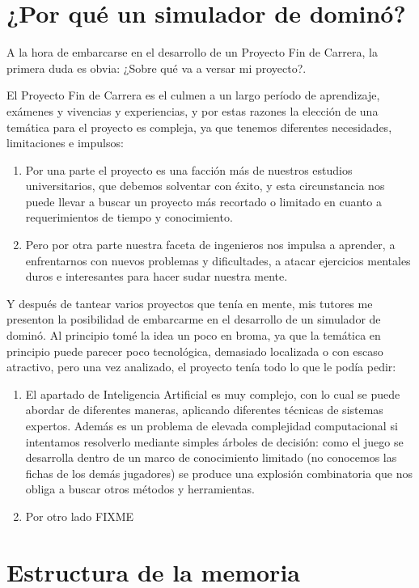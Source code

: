 

\section{¿Por qué un simulador de dominó?}

A la hora de embarcarse en el desarrollo de un Proyecto Fin de Carrera, la primera duda es obvia: ¿Sobre qué va a versar mi proyecto?.

El Proyecto Fin de Carrera es el culmen a un largo período de aprendizaje, exámenes y vivencias y experiencias, y por estas razones la elección de una temática para el proyecto es compleja, ya que tenemos diferentes necesidades, limitaciones e impulsos:
\begin{enumerate}
    \item Por una parte el proyecto es una facción más de nuestros estudios universitarios, que debemos solventar con éxito, y esta circunstancia nos puede llevar a buscar un proyecto más recortado o limitado en cuanto a requerimientos de tiempo y conocimiento.
    \item Pero por otra parte nuestra faceta de ingenieros nos impulsa a aprender, a enfrentarnos con nuevos problemas y dificultades, a atacar ejercicios mentales duros e interesantes para hacer sudar nuestra mente.
\end{enumerate}

Y después de tantear varios proyectos que tenía en mente, mis tutores me presenton la posibilidad de embarcarme en el desarrollo de un simulador de dominó. Al principio tomé la idea un poco en broma, ya que la temática en principio puede parecer poco tecnológica, demasiado localizada o con escaso atractivo, pero una vez analizado, el proyecto tenía todo lo que le podía pedir:
\begin{enumerate}
    \item El apartado de Inteligencia Artificial es muy complejo, con lo cual se puede abordar de diferentes maneras, aplicando diferentes técnicas de sistemas expertos. Además es un problema de elevada complejidad computacional si intentamos resolverlo mediante simples árboles de decisión: como el juego se desarrolla dentro de un marco de conocimiento limitado (no conocemos las fichas de los demás jugadores) se produce una explosión combinatoria que nos obliga a buscar otros métodos y herramientas.
    \item Por otro lado FIXME
\end{enumerate}

\section{Estructura de la memoria}
